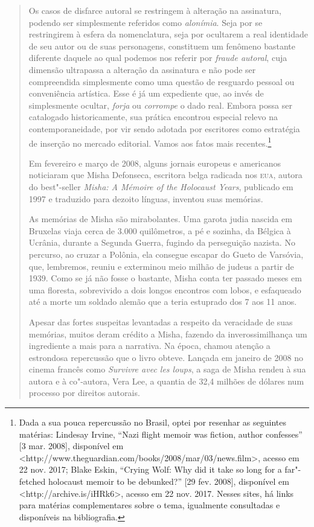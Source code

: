 \begin{quote}
Os casos de disfarce autoral se restringem à alteração na assinatura,
podendo ser simplesmente referidos como \emph{alonímia}. Seja por se
restringirem à esfera da nomenclatura, seja por ocultarem a real
identidade de seu autor ou de suas personagens, constituem um fenômeno
bastante diferente daquele ao qual podemos nos referir por \emph{fraude
autoral}, cuja dimensão ultrapassa a alteração da assinatura e não pode
ser compreendida simplesmente como uma questão de resguardo pessoal ou
conveniência artística. Esse é já um expediente que, ao invés de
simplesmente ocultar, \emph{forja} ou \emph{corrompe} o dado real.
Embora possa ser catalogado historicamente, sua prática encontrou
especial relevo na contemporaneidade, por vir sendo adotada por
escritores como estratégia de inserção no mercado editorial. Vamos aos
fatos mais recentes.\footnote{Dada a sua pouca repercussão no Brasil,
  optei por resenhar as seguintes matérias: Lindesay Irvine, ``Nazi
  flight memoir was fiction, author confesses'' {[}3 mar. 2008{]},
  disponível em
  \textless{}http://www.theguardian.com/books/2008/mar/03/news.film\textgreater{},
  acesso em 22 nov. 2017; Blake Eskin, ``Crying Wolf: Why did it take so
  long for a far"-fetched holocaust memoir to be debunked?'' {[}29 fev.
  2008{]}, disponível em
  \textless{}http://archive.is/iHRk6\textgreater{}, acesso em 22 nov.
  2017. Nesses sites, há links para matérias complementares sobre o
  tema, igualmente consultadas e disponíveis na bibliografia.}

Em fevereiro e março de 2008, alguns jornais europeus e americanos
noticiaram que Misha Defonseca, escritora belga radicada nos
\textsc{eua}, autora do best"-seller \emph{Misha: A Mémoire of the
Holocaust Years}, publicado em 1997 e traduzido para dezoito línguas,
inventou suas memórias.

As memórias de Misha são mirabolantes. Uma garota judia nascida em
Bruxelas viaja cerca de 3.000 quilômetros, a pé e sozinha, da Bélgica à
Ucrânia, durante a Segunda Guerra, fugindo da perseguição nazista. No
percurso, ao cruzar a Polônia, ela consegue escapar do Gueto de
Varsóvia, que, lembremos, reuniu e exterminou meio milhão de judeus a
partir de 1939. Como se já não fosse o bastante, Misha conta ter passado
meses em uma floresta, sobrevivido a dois longos encontros com lobos, e
esfaqueado até a morte um soldado alemão que a teria estuprado dos 7 aos
11 anos.

Apesar das fortes suspeitas levantadas a respeito da veracidade de suas
memórias, muitos deram crédito a Misha, fazendo da inverossimilhança um
ingrediente a mais para a narrativa. Na época, chamou atenção a
estrondosa repercussão que o livro obteve. Lançada em janeiro de 2008 no
cinema francês como \emph{Survivre avec les loups}, a saga de Misha
rendeu à sua autora e à co"-autora, Vera Lee, a quantia de 32,4 milhões
de dólares num processo por direitos autorais.


\end{quote}
